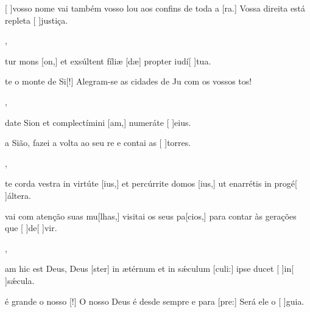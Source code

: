 {    {\item {}[ ]{vos}so nome vai também vosso lou aos confins de toda a [ra.] Vossa direita está repleta [ ]{jus}{ti}ça.~\Antiphona},
  {\item {}tur mons [on,] et exsúltent fíliæ [dæ] propter iudí[ ]{tu}a.~\Antiphona}%
    {\item {}te o monte de Si[!] Alegram-se as cida\-des de Ju com os vossos tos!~\Antiphona},
  {\item {}date Sion et complectímini [am,] numeráte [ ]{e}ius.~\Antiphona}%
    {\item {} a Sião, fazei a volta ao seu re e contai as [ ]{tor}res.~\Antiphona},
  {\item {}te corda vestra in virtúte [ius,] et percúrrite domos [ius,] ut enarrétis in progé[ ]{ál}tera.~\Antiphona}%
    {\item {}vai com atenção suas mu[lhas,] visitai os seus pa[cios,] para contar às gerações que [ ]{de}[ ]{vir}.~\Antiphona},
  {\item {}am hic est Deus, Deus [ster] in ætérnum et in sǽculum [culi:] ipse ducet [ ]{in}[ ]{sǽ}cula.~\Antiphona}%
    {\item {} é grande o nosso [!] O nosso Deus é desde sempre e para [pre:] Será ele o [ ]{gui}a.~\Antiphona}
}